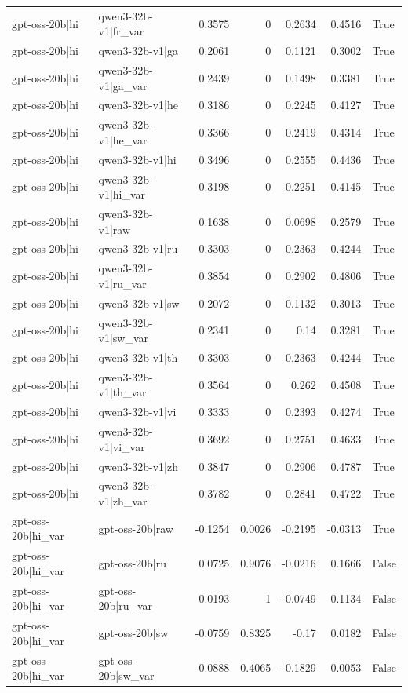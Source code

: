 \begin{table}
\begin{tabular}{l l r r r r l}
gpt-oss-20b|hi & qwen3-32b-v1|fr_var & 0.3575 & 0 & 0.2634 & 0.4516 & True \\
gpt-oss-20b|hi & qwen3-32b-v1|ga & 0.2061 & 0 & 0.1121 & 0.3002 & True \\
gpt-oss-20b|hi & qwen3-32b-v1|ga_var & 0.2439 & 0 & 0.1498 & 0.3381 & True \\
gpt-oss-20b|hi & qwen3-32b-v1|he & 0.3186 & 0 & 0.2245 & 0.4127 & True \\
gpt-oss-20b|hi & qwen3-32b-v1|he_var & 0.3366 & 0 & 0.2419 & 0.4314 & True \\
gpt-oss-20b|hi & qwen3-32b-v1|hi & 0.3496 & 0 & 0.2555 & 0.4436 & True \\
gpt-oss-20b|hi & qwen3-32b-v1|hi_var & 0.3198 & 0 & 0.2251 & 0.4145 & True \\
gpt-oss-20b|hi & qwen3-32b-v1|raw & 0.1638 & 0 & 0.0698 & 0.2579 & True \\
gpt-oss-20b|hi & qwen3-32b-v1|ru & 0.3303 & 0 & 0.2363 & 0.4244 & True \\
gpt-oss-20b|hi & qwen3-32b-v1|ru_var & 0.3854 & 0 & 0.2902 & 0.4806 & True \\
gpt-oss-20b|hi & qwen3-32b-v1|sw & 0.2072 & 0 & 0.1132 & 0.3013 & True \\
gpt-oss-20b|hi & qwen3-32b-v1|sw_var & 0.2341 & 0 & 0.14 & 0.3281 & True \\
gpt-oss-20b|hi & qwen3-32b-v1|th & 0.3303 & 0 & 0.2363 & 0.4244 & True \\
gpt-oss-20b|hi & qwen3-32b-v1|th_var & 0.3564 & 0 & 0.262 & 0.4508 & True \\
gpt-oss-20b|hi & qwen3-32b-v1|vi & 0.3333 & 0 & 0.2393 & 0.4274 & True \\
gpt-oss-20b|hi & qwen3-32b-v1|vi_var & 0.3692 & 0 & 0.2751 & 0.4633 & True \\
gpt-oss-20b|hi & qwen3-32b-v1|zh & 0.3847 & 0 & 0.2906 & 0.4787 & True \\
gpt-oss-20b|hi & qwen3-32b-v1|zh_var & 0.3782 & 0 & 0.2841 & 0.4722 & True \\
gpt-oss-20b|hi_var & gpt-oss-20b|raw & -0.1254 & 0.0026 & -0.2195 & -0.0313 & True \\
gpt-oss-20b|hi_var & gpt-oss-20b|ru & 0.0725 & 0.9076 & -0.0216 & 0.1666 & False \\
gpt-oss-20b|hi_var & gpt-oss-20b|ru_var & 0.0193 & 1 & -0.0749 & 0.1134 & False \\
gpt-oss-20b|hi_var & gpt-oss-20b|sw & -0.0759 & 0.8325 & -0.17 & 0.0182 & False \\
gpt-oss-20b|hi_var & gpt-oss-20b|sw_var & -0.0888 & 0.4065 & -0.1829 & 0.0053 & False \\

\end{tabular}
\end{table}
